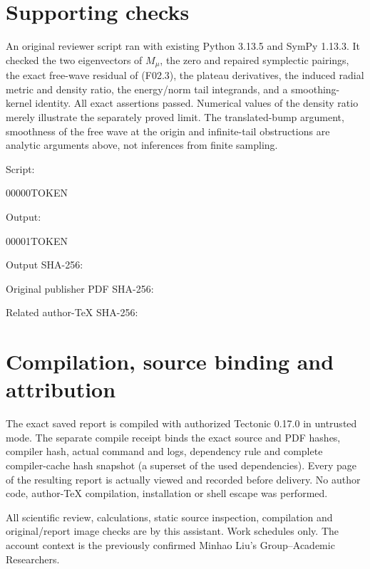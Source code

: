 \documentclass[10pt]{article}
\begin{document}
\section*{Supporting checks}
An original reviewer script ran with existing Python 3.13.5 and SymPy 1.13.3. It checked the two eigenvectors of \(M_\mu\), the zero and repaired symplectic pairings, the exact free-wave residual of (F02.3), the plateau derivatives, the induced radial metric and density ratio, the energy/norm tail integrands, and a smoothing-kernel identity. All exact assertions passed. Numerical values of the density ratio merely illustrate the separately proved limit. The translated-bump argument, smoothness of the free wave at the origin and infinite-tail obstructions are analytic arguments above, not inferences from finite sampling.\par
Script:\par
00000TOKEN\par
Output:\par
00001TOKEN\par
Output SHA-256:\par
Original publisher PDF SHA-256:\par
Related author-TeX SHA-256:\par
\section*{Compilation, source binding and attribution}
The exact saved report is compiled with authorized Tectonic 0.17.0 in untrusted mode. The separate compile receipt binds the exact source and PDF hashes, compiler hash, actual command and logs, dependency rule and complete compiler-cache hash snapshot (a superset of the used dependencies). Every page of the resulting report is actually viewed and recorded before delivery. No author code, author-TeX compilation, installation or shell escape was performed.\par
All scientific review, calculations, static source inspection, compilation and original/report image checks are by this assistant. Work schedules only. The account context is the previously confirmed Minhao Liu’s Group–Academic Researchers.\par
\end{document}
